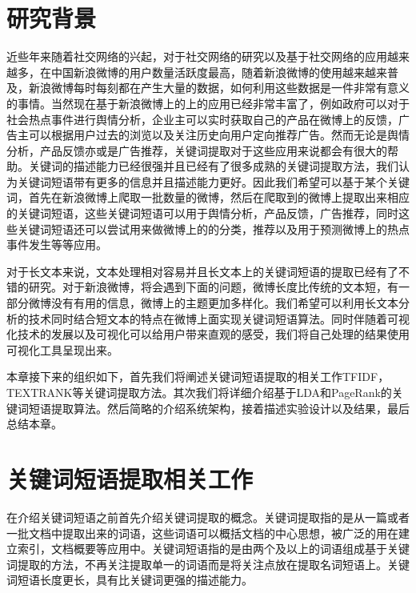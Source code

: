 \documentclass[master]{njuthesis}
\begin{document}
\section{研究背景}

近些年来随着社交网络的兴起，对于社交网络的研究以及基于社交网络的应用越来越多，在中国新浪微博的用户数量活跃度最高，随着新浪微博的使用越来越来普及，新浪微博每时每刻都在产生大量的数据，如何利用这些数据是一件非常有意义的事情。当然现在基于新浪微博上的上的应用已经非常丰富了，例如政府可以对于社会热点事件进行舆情分析，企业主可以实时获取自己的产品在微博上的反馈，广告主可以根据用户过去的浏览以及关注历史向用户定向推荐广告。然而无论是舆情分析，产品反馈亦或是广告推荐，关键词提取对于这些应用来说都会有很大的帮助。关键词的描述能力已经很强并且已经有了很多成熟的关键词提取方法，我们认为关键词短语带有更多的信息并且描述能力更好。因此我们希望可以基于某个关键词，首先在新浪微博上爬取一批数量的微博，然后在爬取到的微博上提取出来相应的关键词短语，这些关键词短语可以用于舆情分析，产品反馈，广告推荐，同时这些关键词短语还可以尝试用来做微博上的的分类，推荐以及用于预测微博上的热点事件发生等等应用。

对于长文本来说，文本处理相对容易并且长文本上的关键词短语的提取已经有了不错的研究。对于新浪微博，将会遇到下面的问题，微博长度比传统的文本短，有一部分微博没有有用的信息，微博上的主题更加多样化。我们希望可以利用长文本分析的技术同时结合短文本的特点在微博上面实现关键词短语算法。同时伴随着可视化技术的发展以及可视化可以给用户带来直观的感受，我们将自己处理的结果使用可视化工具呈现出来。

本章接下来的组织如下，首先我们将阐述关键词短语提取的相关工作TFIDF，TEXTRANK等关键词提取方法。其次我们将详细介绍基于LDA和PageRank的关键词短语提取算法。然后简略的介绍系统架构，接着描述实验设计以及结果，最后总结本章。

\section{关键词短语提取相关工作}

在介绍关键词短语之前首先介绍关键词提取的概念。关键词提取指的是从一篇或者一批文档中提取出来的词语，这些词语可以概括文档的中心思想，被广泛的用在建立索引，文档概要等应用中。关键词短语指的是由两个及以上的词语组成基于关键词提取的方法，不再关注提取单一的词语而是将关注点放在提取名词短语上。关键词短语长度更长，具有比关键词更强的描述能力。
\end{document}
